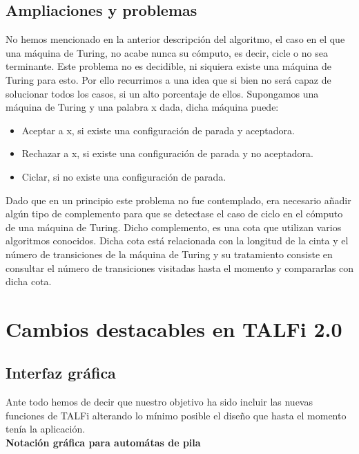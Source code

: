\documentclass[12pt,a4paper,spanish]{book}
\begin{document}
\subsection{Ampliaciones y problemas}
No hemos mencionado en la anterior descripci\'on del algoritmo, el caso en el que una m\'aquina de Turing, no acabe nunca su c\'omputo, es decir, cicle o no sea terminante.
Este problema no es decidible, ni siquiera existe una m\'aquina de Turing para esto.
Por ello recurrimos a una idea que si bien no ser\'a capaz de solucionar todos los casos, si un alto porcentaje de ellos.
Supongamos una m\'aquina de Turing y una palabra x dada, dicha m\'aquina puede:
\begin{itemize}
\item Aceptar a x, si existe una configuraci\'on de parada y aceptadora.
\item Rechazar a x, si existe una configuraci\'on de parada y no aceptadora.
\item Ciclar, si no existe una configuraci\'on de parada.
\end{itemize}
Dado que en un principio este problema no fue contemplado, era necesario a\~nadir alg\'un tipo de complemento para que se detectase el caso de ciclo en el c\'omputo de una m\'aquina de Turing. Dicho complemento, es una cota que utilizan varios algoritmos conocidos. Dicha cota est\'a relacionada con la longitud de la cinta y el n\'umero de transiciones de la m\'aquina de Turing  y su tratamiento consiste en consultar el n\'umero de transiciones visitadas hasta el momento y compararlas con dicha cota.



\section{Cambios destacables en TALFi 2.0}
\subsection{Interfaz gr\'afica}
Ante todo hemos de decir que nuestro objetivo ha sido incluir las nuevas funciones de TALFi alterando lo m\'inimo posible el dise\~no que hasta el momento ten\'ia la aplicaci\'on.\\

{\bf Notaci\'on gr\'afica para autom\'atas de pila\\}
\end{document}
